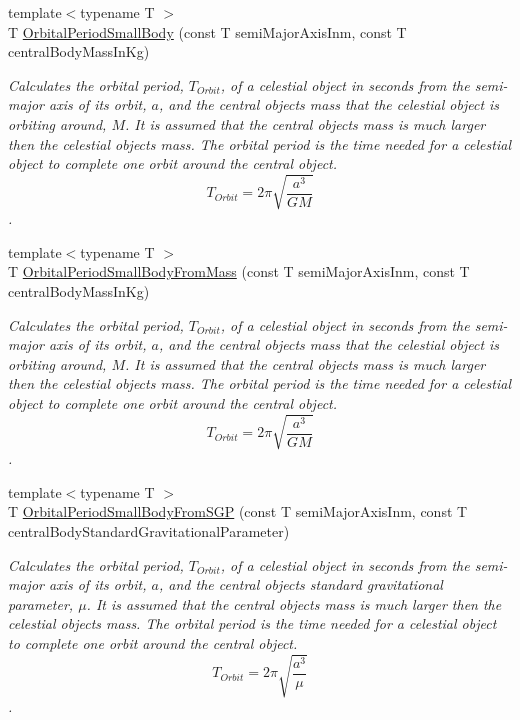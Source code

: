 \begin{DoxyCompactItemize}
{\footnotesize template$<$typename T $>$ }\\T \mbox{\hyperlink{group___e_g_x_phys-_astrophysic-_orbital_period_ga5d4cc706d875fd82a83e566ade16546d}{Orbital\+Period\+Small\+Body}} (const T semi\+Major\+Axis\+Inm, const T central\+Body\+Mass\+In\+Kg)
\begin{DoxyCompactList}\small\item\em Calculates the orbital period, $T_{Orbit}$, of a celestial object in seconds from the semi-\/major axis of its orbit, $a$, and the central object\textquotesingle{}s mass that the celestial object is orbiting around, $M$. It is assumed that the central object\textquotesingle{}s mass is much larger then the celestial objects mass. The orbital period is the time needed for a celestial object to complete one orbit around the central object. \[ T_{Orbit}=2\pi\sqrt{\dfrac{a^3}{GM}}\]. \end{DoxyCompactList}\item 
{\footnotesize template$<$typename T $>$ }\\T \mbox{\hyperlink{group___e_g_x_phys-_astrophysic-_orbital_period_gadfd6fdd5cb1861d8204c3c5cd32a65b5}{Orbital\+Period\+Small\+Body\+From\+Mass}} (const T semi\+Major\+Axis\+Inm, const T central\+Body\+Mass\+In\+Kg)
\begin{DoxyCompactList}\small\item\em Calculates the orbital period, $T_{Orbit}$, of a celestial object in seconds from the semi-\/major axis of its orbit, $a$, and the central object\textquotesingle{}s mass that the celestial object is orbiting around, $M$. It is assumed that the central object\textquotesingle{}s mass is much larger then the celestial objects mass. The orbital period is the time needed for a celestial object to complete one orbit around the central object. \[ T_{Orbit}=2\pi\sqrt{\dfrac{a^3}{GM}}\]. \end{DoxyCompactList}\item 
{\footnotesize template$<$typename T $>$ }\\T \mbox{\hyperlink{group___e_g_x_phys-_astrophysic-_orbital_period_gab3773d2109aef45ef4649b56e36d13f3}{Orbital\+Period\+Small\+Body\+From\+S\+GP}} (const T semi\+Major\+Axis\+Inm, const T central\+Body\+Standard\+Gravitational\+Parameter)
\begin{DoxyCompactList}\small\item\em Calculates the orbital period, $T_{Orbit}$, of a celestial object in seconds from the semi-\/major axis of its orbit, $a$, and the central object\textquotesingle{}s standard gravitational parameter, $\mu$. It is assumed that the central object\textquotesingle{}s mass is much larger then the celestial objects mass. The orbital period is the time needed for a celestial object to complete one orbit around the central object. \[ T_{Orbit}=2\pi\sqrt{\dfrac{a^3}{\mu}}\]. \end{DoxyCompactList}\item 

\end{DoxyCompactItemize}
